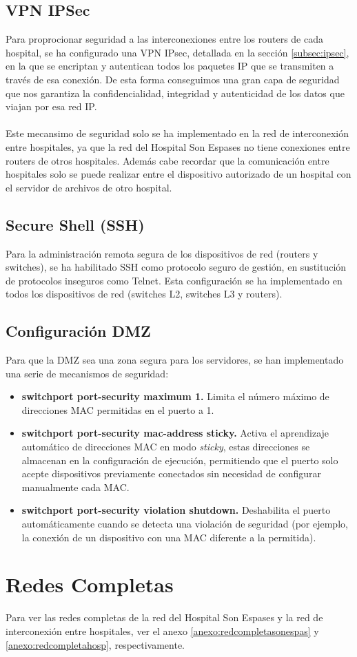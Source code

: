 \subsection{VPN IPSec}
Para proprocionar seguridad a las interconexiones entre los routers de cada hospital, se ha configurado una VPN IPsec, detallada en la sección \ref{subsec:ipsec}, en la que se encriptan y autentican todos los paquetes IP que se transmiten a través de esa conexión.
De esta forma conseguimos una gran capa de seguridad que nos garantiza la confidencialidad, integridad y autenticidad de los datos que viajan por esa red IP.
\\ \\
Este mecansimo de seguridad solo se ha implementado en la red de interconexión entre hospitales, ya que la red del Hospital Son Espases no tiene conexiones entre routers de otros hospitales. 
Además cabe recordar que la comunicación entre hospitales solo se puede realizar entre el dispositivo autorizado de un hospital con el servidor de archivos de otro hospital.

\subsection{Secure Shell (SSH)}
Para la administración remota segura de los dispositivos de red (routers y switches), se ha habilitado SSH como protocolo seguro de gestión, en sustitución de protocolos inseguros como Telnet. 
Esta configuración se ha implementado en todos los dispositivos de red (switches L2, switches L3 y routers). 

\subsection{Configuración DMZ}\label{subsec:dmz}
Para que la DMZ sea una zona segura para los servidores, se han implementado una serie de mecanismos de seguridad:
\begin{itemize}
    \item \textbf{switchport port-security maximum 1.} Limita el número máximo de direcciones \ac{MAC} permitidas en el puerto a 1.
    \item \textbf{switchport port-security mac-address sticky.} Activa el aprendizaje automático de direcciones MAC en modo \textit{sticky}, estas direcciones se almacenan en la configuración de ejecución, permitiendo que el puerto solo acepte dispositivos previamente conectados sin necesidad de configurar manualmente cada MAC.
    \item \textbf{switchport port-security violation shutdown.} Deshabilita el puerto automáticamente cuando se detecta una violación de seguridad (por ejemplo, la conexión de un dispositivo con una MAC diferente a la permitida).
\end{itemize}

\section{Redes Completas}

Para ver las redes completas de la red del Hospital Son Espases y la red de interconexión entre hospitales, ver el anexo \ref{anexo:redcompletasonespas} y \ref{anexo:redcompletahosp}, respectivamente.

